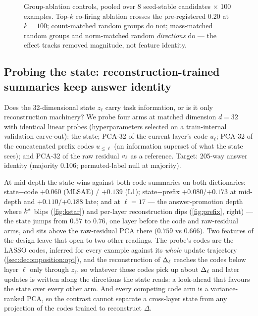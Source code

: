 \begin{figure}[t]
  \centering
  
  \caption{Group-ablation controls, pooled over 8 seed-stable candidates
  $\times$ 100 examples. Top-$k$ co-firing ablation crosses the
  pre-registered 0.20 at $k{=}100$; count-matched random groups do not;
  mass-matched random groups and norm-matched random \emph{directions} do ---
  the effect tracks removed magnitude, not feature identity.}
  \label{fig:distributed}
\end{figure}

\subsection{Probing the state: reconstruction-trained summaries keep answer
identity}
\label{sec:evaluation:probe}

Does the 32-dimensional state $z_\ell$ carry task information, or is it only
reconstruction machinery? We probe four arms at matched dimension
$d{=}32$ with identical linear probes (hyperparameters selected on a
train-internal validation carve-out): the state; PCA-32 of the current
layer's code $u_\ell$; PCA-32 of the concatenated prefix codes $u_{\le\ell}$
(an information superset of what the state sees); and PCA-32 of the raw
residual $v_\ell$ as a reference. Target: 205-way answer identity (majority
0.106; permuted-label null at majority).

At mid-depth the state wins against both code summaries on both dictionaries:
state$-$code $+0.060$  (MLSAE) /
$+0.139$  (L1); state$-$prefix $+0.080$/$+0.173$ at
mid-depth and $+0.110$/$+0.188$ late; and at $\ell{=}17$ --- the
answer-promotion depth where $k^{\ast}$ blips (\cref{fig:kstar}) and per-layer
reconstruction dips (\cref{fig:prefix}, right) --- the state jumps from
$0.57$ to $0.76$, one layer before the code and raw-residual arms, and sits
above the raw-residual PCA there ($0.759$ vs $0.666$). Two features of the
design leave that open to two other readings. The probe's codes are the LASSO
codes, inferred for every example against its \emph{whole} update trajectory
(\cref{sec:decomposition:opt}), and the reconstruction of $\Delta_\ell$ reaches the
codes below layer $\ell$ only through $z_\ell$, so whatever those codes pick
up about $\Delta_\ell$ and later updates is written along the directions the state
reads: a look-ahead that favours the state over every other arm. And every
competing code arm is a variance-ranked PCA, so the contrast cannot separate
a cross-layer state from any projection of the codes trained to reconstruct
$\Delta$.

